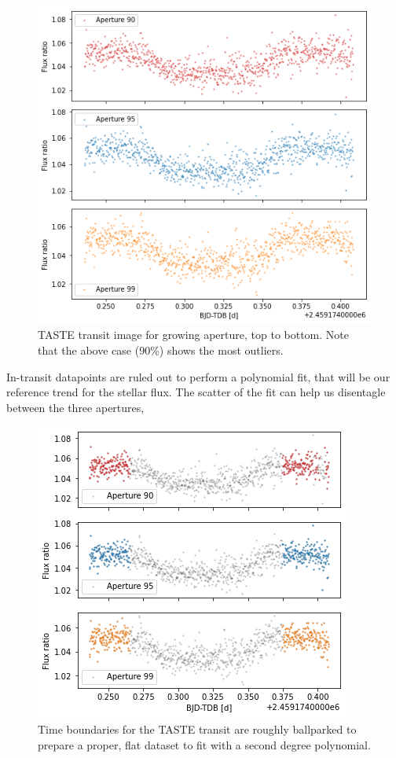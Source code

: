 \documentclass{aa}
\begin{document}
\begin{figure}[h]
    \centering
    \includegraphics[scale=0.4, angle=0]{pictures/transits.png}
    \caption{TASTE transit image for growing aperture, top to bottom. Note that the above case (90\%) shows the most outliers.}
    \label{fig:transits}
\end{figure}
In-transit datapoints are ruled out to perform a polynomial fit, that will be our reference trend for the stellar flux. The scatter of the fit can help us disentagle between the three apertures, 
\begin{figure}[h]
    \centering  
    \includegraphics[scale=0.5, angle=0]{pictures/fit_setting.png}
    \caption{Time boundaries for the TASTE transit are roughly ballparked to prepare a proper, flat dataset to fit with a second degree polynomial.}
    \label{fig:fit_setting}
\end{figure}
\end{document}
